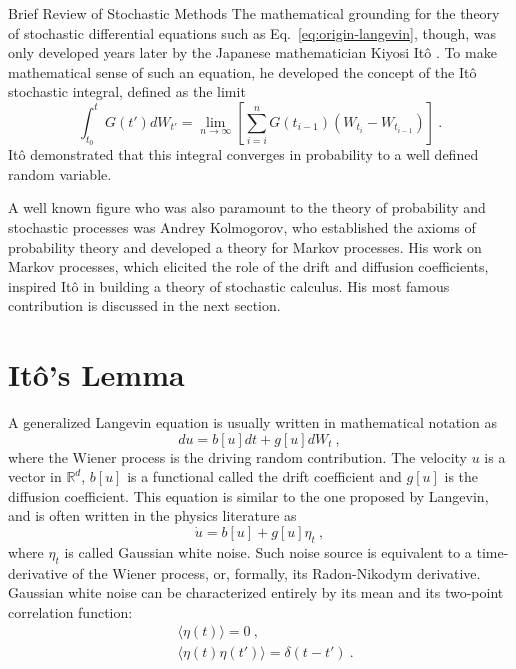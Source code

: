 \begin{chapter}{Brief Review of Stochastic Methods}
The mathematical grounding for the theory of stochastic differential
equations such as Eq.~\eqref{eq:origin-langevin},
though, was only developed years later by the Japanese
mathematician Kiyosi Itô \parencite{ito1944}.
To make mathematical sense of such an equation,
he developed the concept of the
Itô stochastic integral, defined as the limit
\begin{equation} \label{eq:ito-integral}
    \int_{t_0}^t G(t') dW_{t'} =
    \lim_{n \to \infty} \left[ \sum_{i=i}^n G(t_{i-1}) ( W_{t_i} - W_{t_{i-1}} ) \right]
    \ .
\end{equation}
Itô demonstrated that this integral
converges in probability to a well defined random variable.

A well known figure who was also paramount to the theory of
probability and stochastic processes was Andrey Kolmogorov, who
established the axioms
of probability theory and developed a theory for Markov processes.
His work on Markov processes, which elicited the role of the drift and diffusion coefficients, inspired Itô in building a theory of
stochastic calculus. His most famous contribution is
discussed in the next section.

\section{Itô's Lemma}

A generalized Langevin equation is usually written in mathematical
notation as
\begin{equation} \label{eq:langevin}
    du = b[u] dt + g[u] d W_t \ ,
\end{equation}
where the Wiener process is the driving random
contribution. The velocity
$u$ is a vector in $\mathbb{R}^d$,
$b[u]$ is a functional called the drift coefficient and $g[u]$
is the diffusion coefficient.
This equation is similar to the one proposed by Langevin,
and is often written in the physics literature as
\begin{equation} \label{eq:diff-langevin}
    \dot u = b[u] + g[u] \eta_t \ ,
\end{equation}
where $\eta_t$ is called Gaussian white noise.
Such noise source is equivalent to a time-derivative of the
Wiener process, or, formally, its Radon-Nikodym derivative.
Gaussian white noise can be characterized entirely
by its mean and its two-point correlation function:
\begin{equation} \label{eq:gauss-noise}
	\begin{split}
		&\langle \eta(t) \rangle = 0 \ , \\
		&\langle \eta(t) \eta(t') \rangle = \delta(t-t') \ .
	\end{split}
\end{equation}


\end{chapter}
